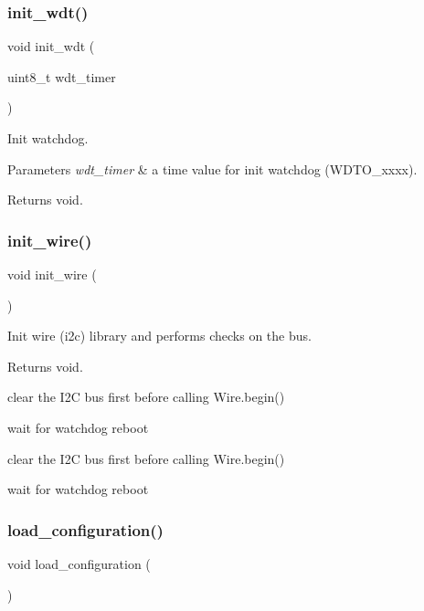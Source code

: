 \subsubsection{\texorpdfstring{init\+\_\+wdt()}{init\_wdt()}}
{\footnotesize\ttfamily void init\+\_\+wdt (\begin{DoxyParamCaption}\item[{uint8\+\_\+t}]{wdt\+\_\+timer }\end{DoxyParamCaption})}



Init watchdog. 


\begin{DoxyParams}{Parameters}
{\em wdt\+\_\+timer} & a time value for init watchdog (W\+D\+T\+O\+\_\+xxxx). \\
\hline
\end{DoxyParams}
\begin{DoxyReturn}{Returns}
void. 
\end{DoxyReturn}
\mbox{\label{i2c-th_8h_a7c21452937863fa02a29654247eef09b}} 
\subsubsection{\texorpdfstring{init\+\_\+wire()}{init\_wire()}}
{\footnotesize\ttfamily void init\+\_\+wire (\begin{DoxyParamCaption}{ }\end{DoxyParamCaption})}



Init wire (i2c) library and performs checks on the bus. 

\begin{DoxyReturn}{Returns}
void. 
\end{DoxyReturn}
clear the I2C bus first before calling Wire.\+begin()

wait for watchdog reboot

clear the I2C bus first before calling Wire.\+begin()

wait for watchdog reboot \mbox{\label{i2c-th_8h_a1be652e7d942160a14a560e0be837358}} 
\subsubsection{\texorpdfstring{load\+\_\+configuration()}{load\_configuration()}}
{\footnotesize\ttfamily void load\+\_\+configuration (\begin{DoxyParamCaption}{ }\end{DoxyParamCaption})}



